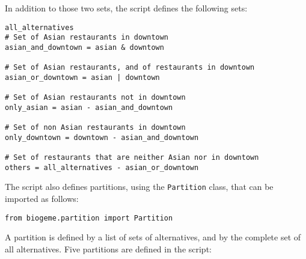\documentclass[12pt,a4paper]{article}
\begin{document}
In addition to those two sets, the script defines the following sets:
\begin{lstlisting}
all_alternatives
# Set of Asian restaurants in downtown
asian_and_downtown = asian & downtown

# Set of Asian restaurants, and of restaurants in downtown
asian_or_downtown = asian | downtown

# Set of Asian restaurants not in downtown
only_asian = asian - asian_and_downtown

# Set of non Asian restaurants in downtown
only_downtown = downtown - asian_and_downtown

# Set of restaurants that are neither Asian nor in downtown
others = all_alternatives - asian_or_downtown
\end{lstlisting}

The script also defines partitions, using the \lstinline+Partition+ class, that can be imported as follows:
\begin{lstlisting}
from biogeme.partition import Partition
\end{lstlisting}
A partition is defined by a list of sets of alternatives, and by the complete set of all alternatives. Five partitions are defined in the script:
\end{document}
